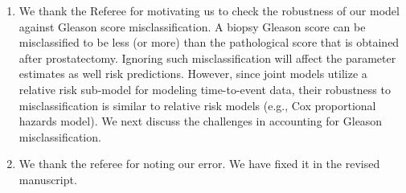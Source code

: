 \begin{enumerate}
\item \textbf{\color{blue}{In PRIAS study, is the dataset split into a training set for joint modeling, and a testing set for determining the personalized schedules and calculating the validation summaries? Also if $\kappa= 10\%$ was decided as in Figure 4, should one consider cross-validation?}}

We thank the Referee for motivating us to check the robustness of our model against Gleason score misclassification. A biopsy Gleason score can be misclassified to be less (or more) than the pathological score that is obtained after prostatectomy. Ignoring such misclassification will affect the parameter estimates as well risk predictions. However, since joint models utilize a relative risk sub-model for modeling time-to-event data, their robustness to misclassification is similar to relative risk models (e.g., Cox proportional hazards model). We next discuss the challenges in accounting for Gleason misclassification. 

\item \textbf{\color{blue}{Page 14, last line, $t_5$ = 4.5 year, should it be $t_5$ = 5.5 year?}}

We thank the referee for noting our error. We have fixed it in the revised manuscript.
\end{enumerate}

